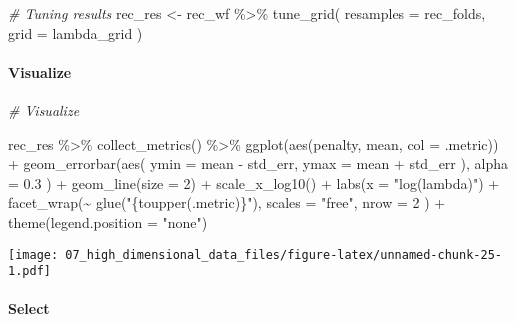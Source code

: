 \documentclass[
]{book}
\newenvironment{Shaded}{\begin{snugshade}}{\end{snugshade}}
\newcommand{\AttributeTok}[1]{\textcolor[rgb]{0.77,0.63,0.00}{#1}}
\newcommand{\CommentTok}[1]{\textcolor[rgb]{0.56,0.35,0.01}{\textit{#1}}}
\newcommand{\DecValTok}[1]{\textcolor[rgb]{0.00,0.00,0.81}{#1}}
\newcommand{\FloatTok}[1]{\textcolor[rgb]{0.00,0.00,0.81}{#1}}
\newcommand{\FunctionTok}[1]{\textcolor[rgb]{0.00,0.00,0.00}{#1}}
\newcommand{\NormalTok}[1]{#1}
\newcommand{\OtherTok}[1]{\textcolor[rgb]{0.56,0.35,0.01}{#1}}
\newcommand{\SpecialCharTok}[1]{\textcolor[rgb]{0.00,0.00,0.00}{#1}}
\newcommand{\StringTok}[1]{\textcolor[rgb]{0.31,0.60,0.02}{#1}}
\begin{document}
\begin{Shaded}
\begin{Highlighting}[]
\CommentTok{\# Tuning results}
\NormalTok{rec\_res }\OtherTok{\textless{}{-}}\NormalTok{ rec\_wf }\SpecialCharTok{\%\textgreater{}\%}
  \FunctionTok{tune\_grid}\NormalTok{(}
    \AttributeTok{resamples =}\NormalTok{ rec\_folds,}
    \AttributeTok{grid =}\NormalTok{ lambda\_grid}
\NormalTok{  )}
\end{Highlighting}
\end{Shaded}

\hypertarget{visualize}{%
\paragraph{Visualize}\label{visualize}}

\begin{Shaded}
\begin{Highlighting}[]
\CommentTok{\# Visualize}

\NormalTok{rec\_res }\SpecialCharTok{\%\textgreater{}\%}
  \FunctionTok{collect\_metrics}\NormalTok{() }\SpecialCharTok{\%\textgreater{}\%}
  \FunctionTok{ggplot}\NormalTok{(}\FunctionTok{aes}\NormalTok{(penalty, mean, }\AttributeTok{col =}\NormalTok{ .metric)) }\SpecialCharTok{+}
  \FunctionTok{geom\_errorbar}\NormalTok{(}\FunctionTok{aes}\NormalTok{(}
    \AttributeTok{ymin =}\NormalTok{ mean }\SpecialCharTok{{-}}\NormalTok{ std\_err,}
    \AttributeTok{ymax =}\NormalTok{ mean }\SpecialCharTok{+}\NormalTok{ std\_err}
\NormalTok{  ),}
  \AttributeTok{alpha =} \FloatTok{0.3}
\NormalTok{  ) }\SpecialCharTok{+}
  \FunctionTok{geom\_line}\NormalTok{(}\AttributeTok{size =} \DecValTok{2}\NormalTok{) }\SpecialCharTok{+}
  \FunctionTok{scale\_x\_log10}\NormalTok{() }\SpecialCharTok{+}
  \FunctionTok{labs}\NormalTok{(}\AttributeTok{x =} \StringTok{"log(lambda)"}\NormalTok{) }\SpecialCharTok{+}
  \FunctionTok{facet\_wrap}\NormalTok{(}\SpecialCharTok{\textasciitilde{}} \FunctionTok{glue}\NormalTok{(}\StringTok{"\{toupper(.metric)\}"}\NormalTok{),}
    \AttributeTok{scales =} \StringTok{"free"}\NormalTok{,}
    \AttributeTok{nrow =} \DecValTok{2}
\NormalTok{  ) }\SpecialCharTok{+}
  \FunctionTok{theme}\NormalTok{(}\AttributeTok{legend.position =} \StringTok{"none"}\NormalTok{)}
\end{Highlighting}
\end{Shaded}

\texttt{[image: 07\_high\_dimensional\_data\_files/figure-latex/unnamed-chunk-25-1.pdf]}

\hypertarget{select}{%
\paragraph{Select}\label{select}}
\end{document}
